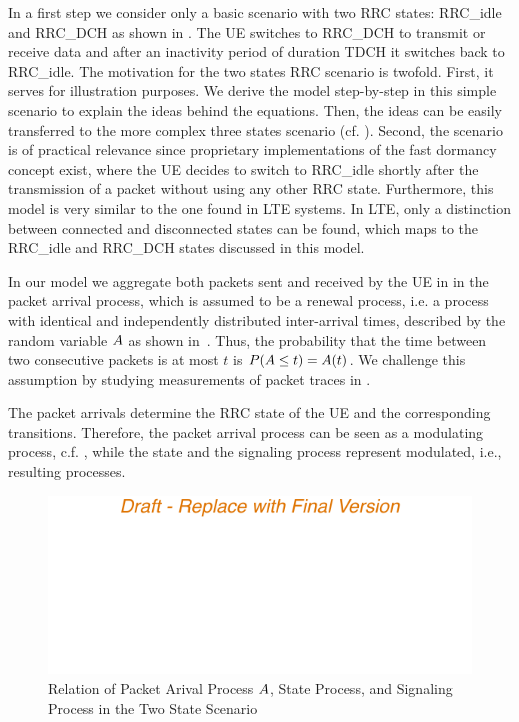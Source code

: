 In a first step we consider only a basic scenario with two \gls{RRC} states: \gls{RRC_idle} and \gls{RRC_DCH} as shown in .
The \gls{UE} switches to \gls{RRC_DCH} to transmit or receive data and after an inactivity period of duration \gls{TDCH} it switches back to \gls{RRC_idle}. 
The motivation for the two states \gls{RRC} scenario is twofold.
First, it serves for illustration purposes.
We derive the model step-by-step in this simple scenario to explain the ideas behind the equations.
Then, the ideas can be easily transferred to the more complex three states scenario (cf. ).
Second, the scenario is of practical relevance since proprietary implementations of the fast dormancy concept \cite{NSN2011} exist, where the \gls{UE} decides to switch to \gls{RRC_idle} shortly after the transmission of a packet without using any other \gls{RRC} state.
Furthermore, this model is very similar to the one found in \gls{LTE} systems.
In \gls{LTE}, only a distinction between connected and disconnected states can be found, which maps to the \gls{RRC_idle} and \gls{RRC_DCH} states discussed in this model.

In our model we aggregate both packets sent and received by the \gls{UE} in in the packet arrival process, which is assumed to be a renewal process, i.e. a process  with identical and independently distributed inter-arrival times, described by the random variable \(A\) as shown in~.
Thus, the probability that the time between two consecutive packets is at most \(t\) is \(P(A \leq t) = A(t)\).
We challenge this assumption by studying measurements of packet traces in .

The packet arrivals determine the \gls{RRC} state of the \gls{UE} and the corresponding transitions. Therefore, the packet arrival process can be seen as a modulating process, c.f. \cite{TranGia1983,TranGia1988}, while the state and the signaling process represent modulated, i.e., resulting processes.

\begin{figure}
  \centering
  \includegraphics{network/performance_model/system_description/figures/arrival_process}
  \caption{Relation of Packet Arival Process \(A\), State Process, and Signaling Process in the Two State Scenario}
  \label{fig:network:performance_model:system_description:arrival_process}
\end{figure}

